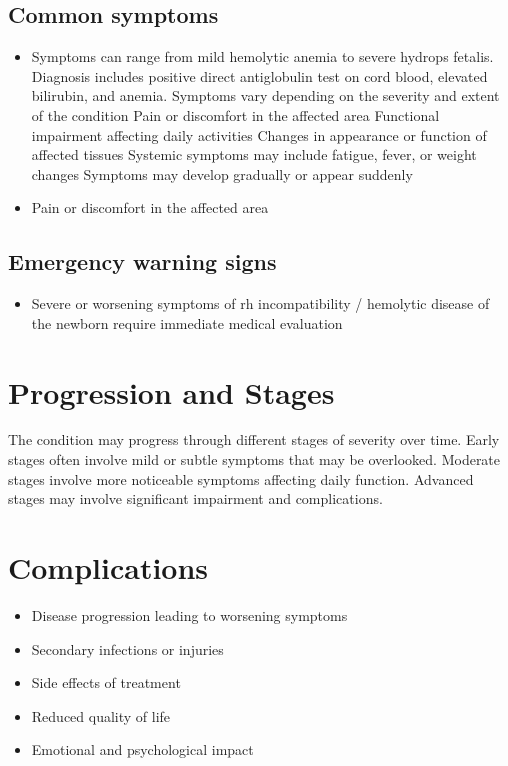 \subsection{Common symptoms}
\begin{itemize}[noitemsep]
  \item Symptoms can range from mild hemolytic anemia to severe hydrops fetalis. Diagnosis includes positive direct antiglobulin test on cord blood, elevated bilirubin, and anemia. Symptoms vary depending on the severity and extent of the condition Pain or discomfort in the affected area Functional impairment affecting daily activities Changes in appearance or function of affected tissues Systemic symptoms may include fatigue, fever, or weight changes Symptoms may develop gradually or appear suddenly
  \item Pain or discomfort in the affected area
  \end{itemize}

\subsection{Emergency warning signs}
\begin{itemize}[noitemsep]
  \item Severe or worsening symptoms of rh incompatibility / hemolytic disease of the newborn require immediate medical evaluation
\end{itemize}
\section{Progression and Stages}
The condition may progress through different stages of severity over time. Early stages often involve mild or subtle symptoms that may be overlooked. Moderate stages involve more noticeable symptoms affecting daily function. Advanced stages may involve significant impairment and complications.
\section{Complications}
\begin{itemize}[noitemsep]
  \item Disease progression leading to worsening symptoms
  \item Secondary infections or injuries
  \item Side effects of treatment
  \item Reduced quality of life
  \item Emotional and psychological impact
\end{itemize}
